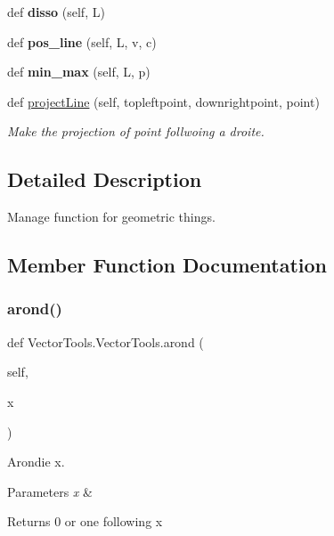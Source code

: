 \begin{DoxyCompactItemize}
def {\bfseries disso} (self, L)
\item 
\mbox{\label{classVectorTools_1_1VectorTools_a40618d0396aa3491afbd00d424eb08c9}} 
def {\bfseries pos\+\_\+line} (self, L, v, c)
\item 
\mbox{\label{classVectorTools_1_1VectorTools_a891901cf77dfd7f986cf08552fe54beb}} 
def {\bfseries min\+\_\+max} (self, L, p)
\item 
def \mbox{\hyperlink{classVectorTools_1_1VectorTools_a80fa6033e6c31745d3036f17dede3b88}{project\+Line}} (self, topleftpoint, downrightpoint, point)
\begin{DoxyCompactList}\small\item\em Make the projection of point follwoing a droite. \end{DoxyCompactList}\end{DoxyCompactItemize}


\subsection{Detailed Description}
Manage function for geometric things. 

\subsection{Member Function Documentation}
\mbox{\label{classVectorTools_1_1VectorTools_a496edcc8955bd09bbcb5ebd513d9f1e4}} 
\subsubsection{\texorpdfstring{arond()}{arond()}}
{\footnotesize\ttfamily def Vector\+Tools.\+Vector\+Tools.\+arond (\begin{DoxyParamCaption}\item[{}]{self,  }\item[{}]{x }\end{DoxyParamCaption})}



Arondie x. 


\begin{DoxyParams}{Parameters}
{\em x} & \\
\hline
\end{DoxyParams}
\begin{DoxyReturn}{Returns}
0 or one following x 
\end{DoxyReturn}
\mbox{\label{classVectorTools_1_1VectorTools_abae91b193f8b6ac2620145a3c22fbf7a}} 
